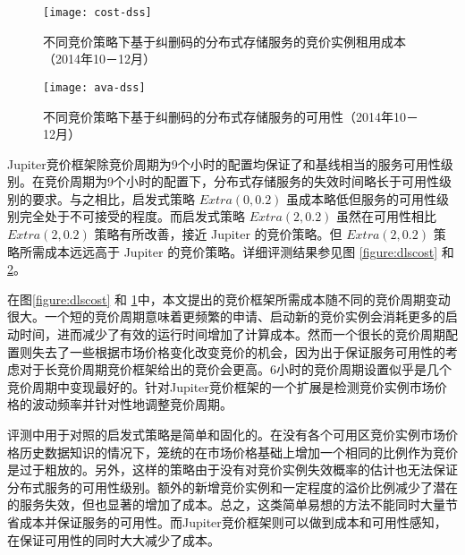 \begin{figure}
  \centering
  \texttt{[image: cost-dss]}
  \caption{不同竞价策略下基于纠删码的分布式存储服务的竞价实例租用成本（2014年10－12月）}
  \label{figure:dsscost}
\end{figure}
\begin{figure}
  \centering
  \texttt{[image: ava-dss]}
  \caption{不同竞价策略下基于纠删码的分布式存储服务的可用性（2014年10－12月）}
  \label{figure:dssavailability}
\end{figure}

Jupiter竞价框架除竞价周期为9个小时的配置均保证了和基线相当的服务可用性级别。在竞价周期为9个小时的配置下，分布式存储服务的失效时间略长于可用性级别的要求。与之相比，启发式策略 $Extra(0, 0.2)$ 虽成本略低但服务的可用性级别完全处于不可接受的程度。而启发式策略 $Extra(2, 0.2)$ 虽然在可用性相比 $Extra(2, 0.2)$ 策略有所改善，接近 Jupiter 的竞价策略。但 $Extra(2, 0.2)$ 策略所需成本远远高于 Jupiter 的竞价策略。详细评测结果参见图 \ref{figure:dlscost} 和 \ref{figure:dssavailability}。

在图\ref{figure:dlscost} 和 \ref{figure:dsscost}中，本文提出的竞价框架所需成本随不同的竞价周期变动很大。一个短的竞价周期意味着更频繁的申请、启动新的竞价实例会消耗更多的启动时间，进而减少了有效的运行时间增加了计算成本。然而一个很长的竞价周期配置则失去了一些根据市场价格变化改变竞价的机会，因为出于保证服务可用性的考虑对于长竞价周期竞价框架给出的竞价会更高。6小时的竞价周期设置似乎是几个竞价周期中变现最好的。针对Jupiter竞价框架的一个扩展是检测竞价实例市场价格的波动频率并针对性地调整竞价周期。

评测中用于对照的启发式策略是简单和固化的。在没有各个可用区竞价实例市场价格历史数据知识的情况下，笼统的在市场价格基础上增加一个相同的比例作为竞价是过于粗放的。另外，这样的策略由于没有对竞价实例失效概率的估计也无法保证分布式服务的可用性级别。额外的新增竞价实例和一定程度的溢价比例减少了潜在的服务失效，但也显著的增加了成本。总之，这类简单易想的方法不能同时大量节省成本并保证服务的可用性。而Jupiter竞价框架则可以做到成本和可用性感知，在保证可用性的同时大大减少了成本。

